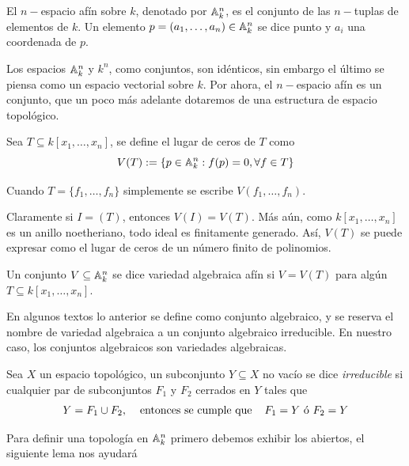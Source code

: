 \documentclass[11pt]{article}
\begin{document}
\begin{dfn}
    El $n-$espacio afín sobre $k$, denotado por $\mathbb{A}_{k}^{n}$, es el conjunto de las $n-$tuplas de
    elementos de $k$. Un elemento $p=(a_{1},\dots,a_{n})\in\mathbb{A}_{k}^{n}$ se dice 
    punto y $a_{i}$ una coordenada de $p$.
\end{dfn}

\noindent Los espacios $\mathbb{A}_{k}^{n}$ y $k^{n}$, como conjuntos, son idénticos, sin embargo el 
último se piensa como un espacio vectorial sobre $k$. Por ahora, el $n-$espacio afín es un 
conjunto, que un poco más adelante dotaremos de una estructura de espacio topológico.

\begin{dfn}
    Sea $T\subseteq k[x_{1},\dots,x_{n}]$, se define el lugar de ceros de $T$ como
    \begin{equation*}
        V(T):=\{p\in\mathbb{A}_{k}^{n}:f(p)=0,\forall f\in T\}
    \end{equation*}
\end{dfn}

\noindent Cuando $T=\{f_{1},\dots,f_{n}\}$ simplemente se escribe $V(f_{1},\dots,f_{n})$.

\vspace{1mm}
\obs Claramente si $I=(T)$, entonces $V(I)=V(T)$. Más aún, como $k[x_{1},\dots,x_{n}]$ es un 
anillo noetheriano, todo ideal es finitamente generado. Así, $V(T)$ se puede expresar como el 
lugar de ceros de un número finito de polinomios.

\begin{dfn}
    Un conjunto $V\subseteq\mathbb{A}_{k}^{n}$ se dice variedad algebraica afín si $V=V(T)$ para algún 
    $T\subseteq k[x_{1},\dots,x_{n}]$.
\end{dfn}

\noindent En algunos textos lo anterior se define como conjunto algebraico, y se reserva el nombre
de variedad algebraica a un conjunto algebraico irreducible. En nuestro caso, los conjuntos 
algebraicos son variedades algebraicas.

\noindent Sea $X$ un espacio topológico, un subconjunto $Y\subseteq X$ no vacío se dice 
\emph{irreducible} si cualquier par de subconjuntos $F_{1}$ y $F_{2}$ cerrados en $Y$ tales que
\begin{equation*}
    Y=F_{1}\cup F_{2}, \hspace{4mm}\text{entonces se cumple que}\hspace{4mm} F_{1}=Y \text{ ó } F_{2}=Y
\end{equation*}

\noindent Para definir una topología en $\mathbb{A}_{k}^{n}$ primero debemos exhibir los abiertos, el 
siguiente lema nos ayudará
\end{document}

